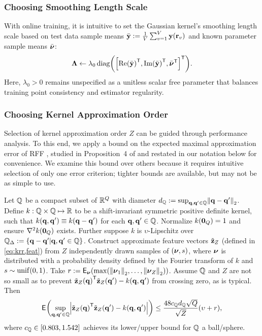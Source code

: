 \subsubsection{Choosing Smoothing Length Scale}
\label{sss,krr,pract,mod,lam}

With online training,
it is intuitive
to set the Gaussian kernel's 
smoothing length scale 
based on test data sample means
$\bar{\bmy} := \frac{1}{V} \sum_{v=1}^V \bmy\paren{\bmr_v}$
and known parameter sample means $\bar{\boldsymbol{\nu}}$:
\begin{align}
	\bmL \gets \lambda_0 
	\diag{\brac{\re{\bar{\bmy}}\tpose, \im{\bar{\bmy}}\tpose, \nubar\tpose}\tpose}.
	\label{eq:krr,length}
\end{align}
Here, $\lambda_0>0$ remains unspecified
as a unitless scalar free parameter
that balances training point consistency 
and estimator regularity.

\subsubsection{Choosing Kernel Approximation Order}
\label{sss,krr,pract,mod,h}

Selection of kernel approximation order $Z$ 
can be guided through performance analysis.  
To this end, 
we apply a bound 
on the expected maximal approximation error 
of RFF \cite{rahimi:07:rff},
studied in Proposition~4 of \cite{sutherland:15:ote}
and restated in our notation below for convenience.
We examine this bound over others
because it requires intuitive selection 
of only one error criterion;
tighter bounds are available,
but may not be as simple to use.
\begin{thm}
	Let $\mathbb{Q}$ 
	be a compact subset of $\mathbb{R}^{Q}$
	with diameter $d_\setQ := \sup_{\bmq,\bmq' \in \setQ} \norm{\bmq-\bmq'}_2$.
	Define $k : \mathbb{Q} \times \mathbb{Q} \mapsto \mathbb{R}$  
	to be a shift-invariant symmetric positive definite kernel,
	such that $k(\mathbf{q},\mathbf{q}') \equiv k(\mathbf{q}-\mathbf{q}')$
	for each $\mathbf{q},\mathbf{q}' \in \mathbb{Q}$.
	Normalize $k(\boldsymbol{0}_{Q}) = 1$ 
	and ensure $\nabla^2 k(\boldsymbol{0}_{Q})$ exists.
	Further suppose $k$ is $\upsilon$-Lipschitz 
	over $\setQD := \set{\bmq-\bmq'|\bmq,\bmq'\in\setQ}$.
	Construct approximate feature vectors $\tilde{\mathbf{z}}_Z$
	(defined in \eqref{eq:krr,feat})
	from $Z$ independently drawn samples of $\paren{\bmnu,s}$,
	where $\boldsymbol{\nu}$ is distributed 
	with a probability density defined by the Fourier transform of $k$
	and $s \sim \unif{0,1}$.
	Take $r := \expect{\bmnu}{\max\paren{\norm{\bmnu_1}_2,\dots,\norm{\bmnu_Z}_2}}$.
	Assume $\mathbb{Q}$ and $Z$ are not so small
	as to prevent $\bmztZa{\bmq}\tpose\bmztZa{\bmq'}-k\paren{\bmq,\bmq'}$
	from crossing zero, as is typical. Then
	\label{thm:rff-approx}
	\begin{align}
		\expect{}{\sup_{\bmq,\bmq' \in \setQ} 
			\abs{\bmztZa{\bmq}\tpose\bmztZa{\bmq'}-k\paren{\bmq,\bmq'}}}
			\leq 
			\frac{48 c_\setQ d_\setQ \sqrt{Q}}{\sqrt{Z}} \paren{\upsilon + r},
			\label{eq:krr,rff-approx}
	\end{align}
	where $c_\setQ \in \brac{0.803,1.542}$
	achieves its lower/upper bound for $\mathbb{Q}$ a ball/sphere.
\end{thm}

